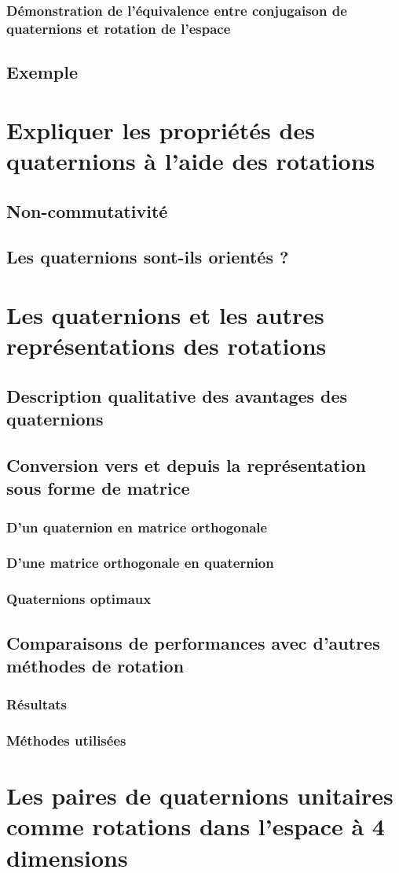 		\subsubsection{Démonstration de l'équivalence entre conjugaison de quaternions et rotation de l'espace}
			
	\subsection{Exemple}
		
	
\section{Expliquer les propriétés des quaternions à l'aide des rotations}
	\subsection{Non-commutativité}
	\subsection{Les quaternions sont-ils orientés ?}
	
\section{Les quaternions et les autres représentations des rotations}
	\subsection{Description qualitative des avantages des quaternions}
	\subsection{Conversion vers et depuis la représentation sous forme de matrice}
		\subsubsection{D'un quaternion en matrice orthogonale}
		\subsubsection{D'une matrice orthogonale en quaternion}
		\subsubsection{Quaternions optimaux}
	\subsection{Comparaisons de performances avec d'autres méthodes de rotation}
		\subsubsection{Résultats}
		\subsubsection{Méthodes utilisées}
\section{Les paires de quaternions unitaires comme rotations dans l'espace à 4 dimensions}